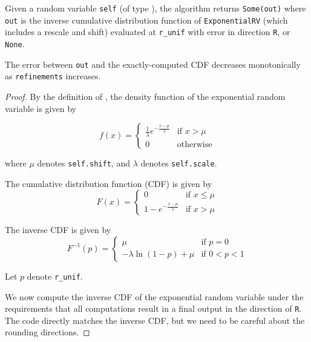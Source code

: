 \documentclass{article}
\begin{document}
\begin{theorem}
Given a random variable \texttt{self} (of type ),
the algorithm returns \texttt{Some(out)} where \texttt{out} is the inverse cumulative distribution function of \texttt{ExponentialRV} (which includes a rescale and shift) evaluated at \texttt{r\_unif}
with error in direction \texttt{R}, or \texttt{None}.

The error between \texttt{out} and the exactly-computed CDF decreases monotonically as \texttt{refinements} increases.
\end{theorem}

\begin{proof} 

By the definition of ,
the density function of the exponential random variable is given by

\begin{equation*}
    f(x) =
    \begin{cases}
        \frac{1}{\lambda} e^{-\frac{x - \mu}{\lambda}} & \text{if } x > \mu \\
        0 & \text{otherwise}
    \end{cases}
\end{equation*}

where $\mu$ denotes \texttt{self.shift},
and $\lambda$ denotes \texttt{self.scale}.

The cumulative distribution function (CDF) is given by
\begin{equation*}
    F(x) = 
    \begin{cases}
        0 & \text{if } x \leq \mu \\
        1 - e^{-\frac{x - \mu}{\lambda}} & \text{if } x > \mu
    \end{cases}
\end{equation*}

The inverse CDF is given by
\begin{equation*}
    F^{-1}(p) = 
    \begin{cases}
        \mu & \text{if } p = 0 \\
        -\lambda \ln(1 - p) + \mu & \text{if } 0 < p < 1
    \end{cases}
\end{equation*}

Let $p$ denote \texttt{r\_unif}.

We now compute the inverse CDF of the exponential random variable
under the requirements that all computations result in a final output in the direction of \texttt{R}.
The code directly matches the inverse CDF, but we need to be careful about the rounding directions.


\end{proof}
\end{document}
